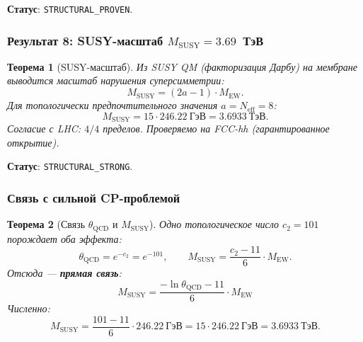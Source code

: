 \documentclass[11pt,a4paper]{article}
\newtheorem{theorem}{Теорема}[section]
\theoremstyle{definition}
\begin{document}
\medskip\noindent
\textbf{Статус}: \texttt{STRUCTURAL\_PROVEN}.

\subsubsection{Результат 8: SUSY-масштаб \texorpdfstring{$M_{\text{SUSY}} = 3.69$}{M\_SUSY = 3.69}~ТэВ}

\begin{theorem}[SUSY-масштаб]
\label{thm:conclusion-susy}
Из SUSY QM (факторизация Дарбу) на мембране выводится
масштаб нарушения суперсимметрии:
\begin{equation}
    \boxed{
    M_{\text{SUSY}} = (2a - 1) \cdot M_{\text{EW}}.
    }
    \label{eq:conclusion-MSUSY}
\end{equation}
Для топологически предпочтительного значения $a = N_{\text{eff}} = 8$:
\begin{equation}
    \boxed{
    M_{\text{SUSY}} = 15 \cdot 246.22~\text{ГэВ}
    = 3.6933~\text{ТэВ}.
    }
    \label{eq:conclusion-MSUSY-value}
\end{equation}
Согласие с LHC: $4/4$ пределов.
Проверяемо на FCC-hh (гарантированное открытие).
\end{theorem}

\medskip\noindent
\textbf{Статус}: \texttt{STRUCTURAL\_STRONG}.

\subsubsection{Связь с сильной CP-проблемой}

\begin{theorem}[Связь $\theta_{\text{QCD}}$ и $M_{\text{SUSY}}$]
\label{thm:theta-msusy-link}
Одно топологическое число $c_2 = 101$ порождает оба эффекта:
\begin{equation}
    \theta_{\text{QCD}} = e^{-c_2} = e^{-101}, \qquad
    M_{\text{SUSY}} = \frac{c_2 - 11}{6} \cdot M_{\text{EW}}.
\end{equation}
Отсюда --- \textbf{прямая связь}:
\begin{equation}
    \boxed{
    M_{\text{SUSY}} = \frac{-\ln \theta_{\text{QCD}} - 11}{6} \cdot M_{\text{EW}}
    }
    \label{eq:theta-msusy-link}
\end{equation}
Численно:
\begin{equation}
    M_{\text{SUSY}} = \frac{101 - 11}{6} \cdot 246.22~\text{ГэВ}
    = 15 \cdot 246.22~\text{ГэВ}
    = 3.6933~\text{ТэВ}.
\end{equation}
\end{theorem}
\end{document}
